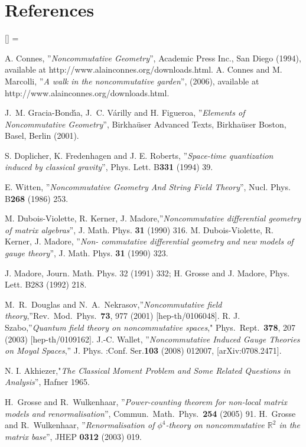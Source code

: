 \documentclass[a4paper,11pt,twoside]{article}
\numberwithin{equation}{section}
\theoremstyle{nonumberplain}
\newcounter{and}
\renewenvironment{thebibliography}[1]{%
\section*{References}%
\frenchspacing\small%
\begin{list}{[\arabic{enumi}]}%
{%
\usecounter{enumi}\parsep=2pt\topsep 0pt%
\settowidth{\labelwidth}{[#1]}%
\leftmargin=\labelwidth\advance\leftmargin\labelsep%
\rightmargin=0pt\itemsep=1pt\sloppy%
}%
}{\end{list}}
\begin{document}
\begin{thebibliography}{50} 

 A. Connes, ''{\it{Noncommutative Geometry}}'', Academic Press Inc., San Diego (1994), available at
http://www.alainconnes.org/downloads.html. A. Connes and M. Marcolli, ''{\it{A walk in the noncommutative garden}}'', (2006), available at http://www.alainconnes.org/downloads.html.

J.~M. Gracia-Bond{\'\i}a, J.~C. V{\'a}rilly and H. Figueroa, ''{\it{Elements of Noncommutative Geometry}}'', Birkha\"user Advanced Texts, Birkha\"user Boston, Basel, Berlin (2001).

 S. Doplicher, K. Fredenhagen and J. E. Roberts, ''{\it{Space-time quantization induced by classical gravity}}'', Phys. Lett. B{\bf{331}} (1994) 39.

 E. Witten, ''{\it{Noncommutative Geometry And String Field Theory}}'', Nucl. Phys. B{\bf{268}} (1986) 253.

 M. Dubois-Violette, R. Kerner, J. Madore,''{\it{Noncommutative differential geometry of matrix
algebras}}'', J. Math. Phys. {\bf{31}} (1990) 316. M. Dubois-Violette, R. Kerner, J. Madore, ''{\it{Non-
commutative differential geometry and new models of gauge theory}}'', J. Math. Phys. {\bf{31}} (1990)
323.

 J. Madore, Journ. Math. Phys. 32 (1991) 332; H. Grosse and J. Madore, Phys. Lett. B283
(1992) 218.

M.~R.~Douglas and N.~A.~Nekrasov,''{\it{Noncommutative field theory}},''Rev.\ Mod.\ Phys.\  {\bf 73}, 977 (2001) [hep-th/0106048]. R. J. Szabo,''{\it{Quantum field theory on noncommutative spaces}}," Phys.\ Rept.\  {\bf 378}, 207 (2003) [hep-th/0109162]. 
J.-C. Wallet, ''{\it{Noncommutative Induced 
Gauge Theories on Moyal Spaces}},'' J. Phys. :Conf. Ser.{\bf{103}} (2008) 012007, [arXiv:0708.2471]. 

 N. I. Akhiezer,"{\it{The Classical Moment Problem and Some Related Questions in Analysis}}'', Hafner 1965.

H.~Grosse and R.~Wulkenhaar, ''{\it{Power-counting theorem for non-local matrix models and renormalisation}}'', Commun.\ Math.\ Phys.\  {\bf 254} (2005) 91. H.~Grosse and R.~Wulkenhaar, ''{\it{Renormalisation of $\phi^4$-theory on noncommutative $\mathbb{R}^2$ in the matrix base}}'', JHEP {\bf 0312} (2003) 019. 


\end{thebibliography}
\end{document}
